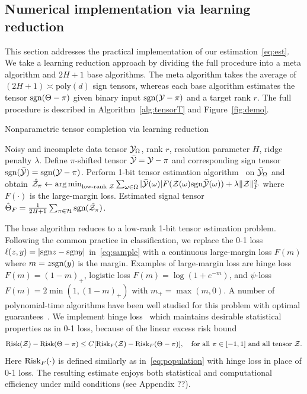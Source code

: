 \documentclass{article}
\theoremstyle{plain}
\theoremstyle{definition}
\def\sign{\textup{sgn}}
\def\risk{\textup{Risk}}
\begin{document}
\subsection{Numerical implementation via learning reduction}
This section addresses the practical implementation of our estimation~\eqref{eq:est}. We take a learning reduction approach by dividing the full procedure into a meta algorithm and $2H+1$ base algorithms. The meta algorithm takes the average of $(2H+1)\asymp \text{poly}(d)$ sign tensors, whereas each base algorithm estimates the tensor $\sign(\Theta-\pi)$ given binary input $\sign(\tY-\pi)$ and a target rank $r$. The full procedure is described in Algorithm~\ref{alg:tensorT} and Figure~\ref{fig:demo}.


\vspace{-.2cm}
\begin{algorithm}[h!]
  \caption{Nonparametric tensor completion via learning reduction}\label{alg:tensorT}
 \begin{algorithmic}[1] 
\INPUT Noisy and incomplete data tensor $\mathcal{Y}_\Omega$, rank $r$, resolution parameter $H$, ridge penalty $\lambda$.
\State Define $\pi$-shifted tensor $\bar {\mathcal{Y}}=\mathcal{Y}-\pi$ and corresponding sign tensor $\sign(\bar \tY)=\sign(\tY-\pi)$. 
\State Perform 1-bit tensor estimation algorithm~\citep{ghadermarzy2018learning,wang2018learning,hong2020generalized,alquier2019estimation} on $\bar {\mathcal{Y}}_\Omega$ and obtain $\hat \tZ_\pi\leftarrow \argmin_{\text{low-rank }\tZ}\sum_{\omega\in \Omega} |\bar \tY(\omega)|F(\tZ(\omega)\sign\bar \tY(\omega))+\lambda\FnormSize{}{\tZ}^2$ where $F(\cdot)$ is the large-margin loss.
\EndFor
\OUTPUT Estimated signal tensor $\hat \Theta_F={1\over 2H+1}\sum_{\pi \in \tH}\sign(\hat \tZ_\pi)$.
\vspace{-.1cm}
\end{algorithmic}
\end{algorithm}
\vspace{-.2cm}

The base algorithm reduces to a low-rank 1-bit tensor estimation problem. Following the common practice in classification, we replace the 0-1 loss $\ell(z,y)=|\sign z - \sign y|$ in~\eqref{eq:sample} with a continuous large-margin loss $F(m)$ where $m=z\sign(y)$ is the margin. Examples of large-margin loss are hinge loss $F(m) = (1-m)_+$, logistic loss $F(m) =\log(1+e^{-m})$, and $\psi$-loss $F(m)=2\min(1,(1-m)_+)$ with $m_{+}=\max(m,0)$. A number of polynomial-time algorithms have been well studied for this problem with optimal guarantees~\citep{ghadermarzy2018learning,wang2018learning,hong2020generalized,alquier2019estimation}. We implement hinge loss~\cite{alquier2019estimation,genzel2020robust} which maintains desirable statistical properties as in 0-1 loss, because of the linear excess risk bound
\[
\risk(\tZ)-\risk(\Theta-\pi)\leq C[\risk_F(\tZ)-\risk_F(\Theta-\pi)],\quad \text{for all }\pi\in[-1,1] \text{ and all tensor }\tZ.
\]
Here $\risk_F(\cdot)$ is defined similarly as in~\eqref{eq:population} with hinge loss in place of 0-1 loss. The resulting estimate enjoys both statistical and computational efficiency under mild conditions (see Appendix {\color{red} ??}). 
\end{document}

